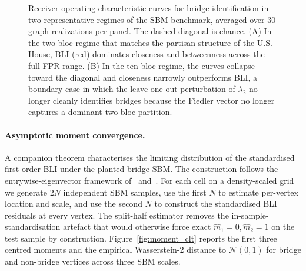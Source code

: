 \documentclass[12pt, a4paper]{article}
\begin{document}
\begin{figure}[H]
\caption{Receiver operating characteristic curves for bridge identification in two representative regimes of the SBM benchmark, averaged over 30 graph realizations per panel. The dashed diagonal is chance. (A) In the two-bloc regime that matches the partisan structure of the U.S. House, BLI (red) dominates closeness and betweenness across the full FPR range. (B) In the ten-bloc regime, the curves collapse toward the diagonal and closeness narrowly outperforms BLI, a boundary case in which the leave-one-out perturbation of $\lambda_2$ no longer cleanly identifies bridges because the Fiedler vector no longer captures a dominant two-bloc partition.}
\label{fig:auc_benchmark}
\end{figure}

\paragraph{Asymptotic moment convergence.} A companion theorem characterises the limiting distribution of the standardised first-order BLI under the planted-bridge SBM. The construction follows the entrywise-eigenvector framework of~\citet{abbe2020entrywise} and~\citet{cape2019signal}. For each cell on a density-scaled grid we generate $2N$ independent SBM samples, use the first $N$ to estimate per-vertex location and scale, and use the second $N$ to construct the standardised BLI residuals at every vertex. The split-half estimator removes the in-sample-standardisation artefact that would otherwise force exact $\widehat{m}_1 = 0, \widehat{m}_2 = 1$ on the test sample by construction. Figure~\ref{fig:moment_clt} reports the first three centred moments and the empirical Wasserstein-2 distance to $\mathcal{N}(0, 1)$ for bridge and non-bridge vertices across three SBM scales.
\end{document}
